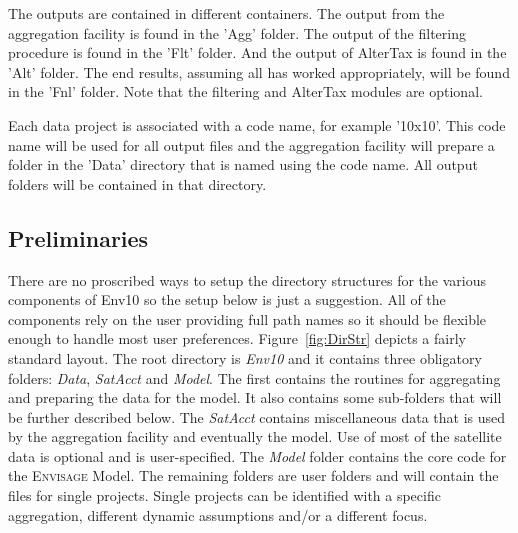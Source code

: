 The outputs are contained in different containers. The output from the
aggregation facility is found in the 'Agg' folder. The output of the filtering
procedure is found in the 'Flt' folder. And the output of AlterTax is found in
the 'Alt' folder. The end results, assuming all has worked appropriately, will
be found in the 'Fnl' folder. Note that the filtering and AlterTax modules are
optional.

Each data project is associated with a code name, for example '10x10'. This code
name will be used for all output files and the aggregation facility will prepare
a folder in the 'Data' directory that is named using the code name. All output
folders will be contained in that directory.

\subsection{Preliminaries}

There are no proscribed ways to setup the directory structures for the various
components of Env10 so the setup below is just a suggestion. All of the
components rely on the user providing full path names so it should be flexible
enough to handle most user preferences. Figure~\ref{fig:DirStr} depicts a fairly
standard layout. The root directory is \emph{Env10} and it contains three
obligatory folders: \emph{Data}, \emph{SatAcct} and \emph{Model}. The first
contains the routines for aggregating and preparing the data for the model. It
also contains some sub-folders that will be further described below. The
\emph{SatAcct} contains miscellaneous data that is used by the aggregation
facility and eventually the model. Use of most of the satellite data is optional
and is user-specified. The \emph{Model} folder contains the core code for the
\textsc{Envisage} Model. The remaining folders are user folders and will contain
the files for single projects. Single projects can be identified with a specific
aggregation, different dynamic assumptions and/or a different focus.

